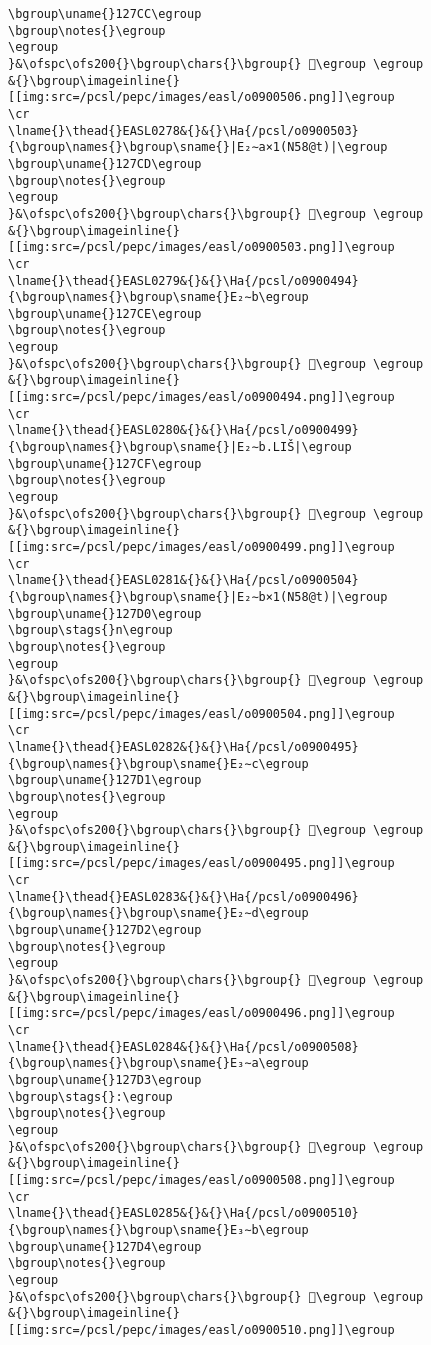 \begin{verbatim}
\bgroup\uname{}127CC\egroup
\bgroup\notes{}\egroup
\egroup
}&\ofspc\ofs200{}\bgroup\chars{}\bgroup{} 𒟌\egroup \egroup
&{}\bgroup\imageinline{}[[img:src=/pcsl/pepc/images/easl/o0900506.png]]\egroup
\cr
\lname{}\thead{}EASL0278&{}&{}\Ha{/pcsl/o0900503}{\bgroup\names{}\bgroup\sname{}|E₂∼a×1(N58@t)|\egroup
\bgroup\uname{}127CD\egroup
\bgroup\notes{}\egroup
\egroup
}&\ofspc\ofs200{}\bgroup\chars{}\bgroup{} 𒟍\egroup \egroup
&{}\bgroup\imageinline{}[[img:src=/pcsl/pepc/images/easl/o0900503.png]]\egroup
\cr
\lname{}\thead{}EASL0279&{}&{}\Ha{/pcsl/o0900494}{\bgroup\names{}\bgroup\sname{}E₂∼b\egroup
\bgroup\uname{}127CE\egroup
\bgroup\notes{}\egroup
\egroup
}&\ofspc\ofs200{}\bgroup\chars{}\bgroup{} 𒟎\egroup \egroup
&{}\bgroup\imageinline{}[[img:src=/pcsl/pepc/images/easl/o0900494.png]]\egroup
\cr
\lname{}\thead{}EASL0280&{}&{}\Ha{/pcsl/o0900499}{\bgroup\names{}\bgroup\sname{}|E₂∼b.LIŠ|\egroup
\bgroup\uname{}127CF\egroup
\bgroup\notes{}\egroup
\egroup
}&\ofspc\ofs200{}\bgroup\chars{}\bgroup{} 𒟏\egroup \egroup
&{}\bgroup\imageinline{}[[img:src=/pcsl/pepc/images/easl/o0900499.png]]\egroup
\cr
\lname{}\thead{}EASL0281&{}&{}\Ha{/pcsl/o0900504}{\bgroup\names{}\bgroup\sname{}|E₂∼b×1(N58@t)|\egroup
\bgroup\uname{}127D0\egroup
\bgroup\stags{}n\egroup
\bgroup\notes{}\egroup
\egroup
}&\ofspc\ofs200{}\bgroup\chars{}\bgroup{} 𒟐\egroup \egroup
&{}\bgroup\imageinline{}[[img:src=/pcsl/pepc/images/easl/o0900504.png]]\egroup
\cr
\lname{}\thead{}EASL0282&{}&{}\Ha{/pcsl/o0900495}{\bgroup\names{}\bgroup\sname{}E₂∼c\egroup
\bgroup\uname{}127D1\egroup
\bgroup\notes{}\egroup
\egroup
}&\ofspc\ofs200{}\bgroup\chars{}\bgroup{} 𒟑\egroup \egroup
&{}\bgroup\imageinline{}[[img:src=/pcsl/pepc/images/easl/o0900495.png]]\egroup
\cr
\lname{}\thead{}EASL0283&{}&{}\Ha{/pcsl/o0900496}{\bgroup\names{}\bgroup\sname{}E₂∼d\egroup
\bgroup\uname{}127D2\egroup
\bgroup\notes{}\egroup
\egroup
}&\ofspc\ofs200{}\bgroup\chars{}\bgroup{} 𒟒\egroup \egroup
&{}\bgroup\imageinline{}[[img:src=/pcsl/pepc/images/easl/o0900496.png]]\egroup
\cr
\lname{}\thead{}EASL0284&{}&{}\Ha{/pcsl/o0900508}{\bgroup\names{}\bgroup\sname{}E₃∼a\egroup
\bgroup\uname{}127D3\egroup
\bgroup\stags{}:\egroup
\bgroup\notes{}\egroup
\egroup
}&\ofspc\ofs200{}\bgroup\chars{}\bgroup{} 𒟓\egroup \egroup
&{}\bgroup\imageinline{}[[img:src=/pcsl/pepc/images/easl/o0900508.png]]\egroup
\cr
\lname{}\thead{}EASL0285&{}&{}\Ha{/pcsl/o0900510}{\bgroup\names{}\bgroup\sname{}E₃∼b\egroup
\bgroup\uname{}127D4\egroup
\bgroup\notes{}\egroup
\egroup
}&\ofspc\ofs200{}\bgroup\chars{}\bgroup{} 𒟔\egroup \egroup
&{}\bgroup\imageinline{}[[img:src=/pcsl/pepc/images/easl/o0900510.png]]\egroup

\end{verbatim}
